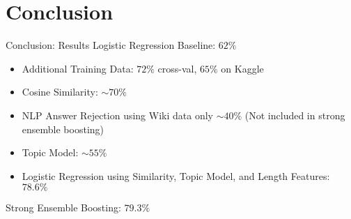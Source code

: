 \documentclass{beamer}
\begin{document}

\section{Conclusion}
\begin{frame}{Conclusion: Results}
Logistic Regression Baseline: {\color{red}$62\%$}
    \begin{itemize}
        \item Additional Training Data: {\color{blue}$72\%$} cross-val, {\color{blue}$65\%$} on Kaggle
        \item Cosine Similarity: {\color{blue}$\sim 70\%$}
	\item NLP Answer Rejection using Wiki data only  {\color{blue}$\sim 40\%$} (Not included in strong ensemble boosting)
        \item Topic Model: {\color{blue}$\sim 55\%$}
        \item Logistic Regression using Similarity, Topic Model, and Length Features: {\color{blue}$78.6\%$}
    \end{itemize}
Strong Ensemble Boosting: {\color{green}$79.3\%$}

\end{frame}
\end{document}
